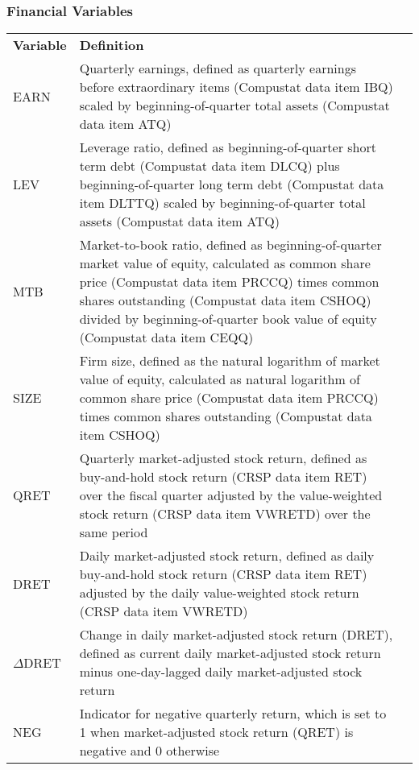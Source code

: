 \subsubsection*{Financial Variables}
\begin{table}[H]
	\centering
	\begin{tabular}{lp{15cm}p{15cm}}
		\textbf{Variable} & \textbf{Definition} \\
		
		EARN & Quarterly earnings, defined as quarterly earnings before extraordinary items (Compustat data item IBQ) scaled by beginning-of-quarter total assets (Compustat data item ATQ) \\
		LEV & Leverage ratio, defined as beginning-of-quarter short term debt (Compustat data item DLCQ) plus beginning-of-quarter long term debt (Compustat data item DLTTQ) scaled by beginning-of-quarter total assets (Compustat data item ATQ) \\
		MTB & Market-to-book ratio, defined as beginning-of-quarter market value of equity, calculated as common share price (Compustat data item PRCCQ) times common shares outstanding (Compustat data item CSHOQ) divided by beginning-of-quarter book value of equity (Compustat data item CEQQ) \\
		SIZE & Firm size, defined as the natural logarithm of market value of equity, calculated as natural logarithm of common share price (Compustat data item PRCCQ) times common shares outstanding (Compustat data item CSHOQ) \\
		QRET & Quarterly market-adjusted stock return, defined as buy-and-hold stock return (CRSP data item RET) over the fiscal quarter adjusted by the value-weighted stock return (CRSP data item VWRETD) over the same period \\
		DRET & Daily market-adjusted stock return, defined as daily buy-and-hold stock return (CRSP data item RET) adjusted by the daily value-weighted stock return (CRSP data item VWRETD)\\
		$\Delta$DRET & Change in daily market-adjusted stock return (DRET), defined as current daily market-adjusted stock return minus one-day-lagged daily market-adjusted stock return \\
		NEG & Indicator for negative quarterly return, which is set to 1 when market-adjusted stock return (QRET) is negative and 0 otherwise \\

\end{tabular}
\end{table}
